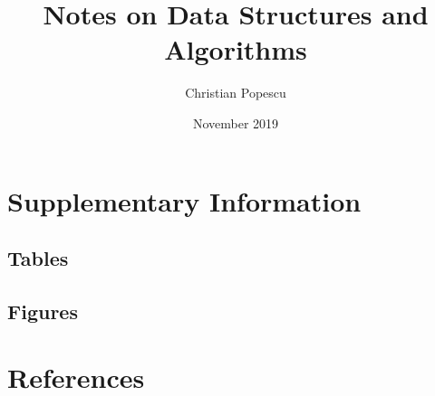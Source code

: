 \documentclass[a4paper,12pt]{book}
\begin{document}
\author{Christian Popescu}
\title{Notes on Data Structures and Algorithms}
\date{November 2019}

\frontmatter
\maketitle
\tableofcontents
\setcounter{secnumdepth}{5}

\mainmatter









\backmatter
\begin{appendices}
	
	\chapter{Supplementary Information}
	
	\section{Tables}
	
	\section{Figures}
	
	\chapter{References}
	
\printbibliography
	
%	
	
\end{appendices}
\end{document}
